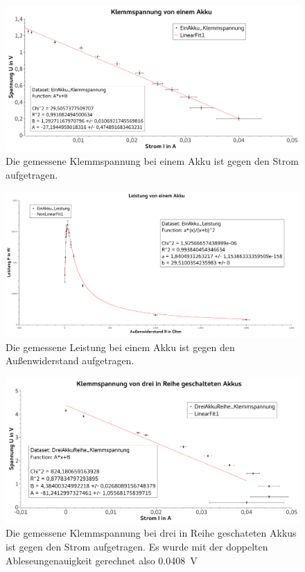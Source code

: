 \documentclass[
	a4paper,
	12pt,
	pagesize,
	ngerman
]{scrartcl}
\begin{document}
	\begin{figure}[tb]
		\includegraphics[width=1\textwidth]{Spannung1}
		\centering
		\caption{Die gemessene Klemmspannung bei einem Akku ist gegen den Strom aufgetragen.}
		\label{Spannung1}
		\centering
	\end{figure} 
	\begin{figure}[tb]
		\includegraphics[width=1\textwidth]{Leistung1}
		\centering
		\caption{Die gemessene Leistung bei einem Akku ist gegen den Außenwiderstand aufgetragen.}
		\label{Leistung1}
		\centering
	\end{figure}
	\begin{figure}[tb]
		\includegraphics[width=1\textwidth]{Spannung3Reihe}
		\centering
		\caption{Die gemessene Klemmspannung bei drei in Reihe geschateten Akkus ist gegen den Strom aufgetragen. Es wurde mit der doppelten Ableseungenauigkeit gerechnet also \SI{0,0408}{V}}
		\label{Spannung3Reihe}
		\centering
	\end{figure} 
\end{document}
